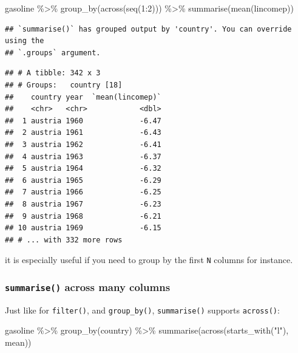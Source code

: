 \documentclass[
]{article}
\newenvironment{Shaded}{\begin{snugshade}}{\end{snugshade}}
\newcommand{\DecValTok}[1]{\textcolor[rgb]{0.00,0.00,0.81}{#1}}
\newcommand{\FunctionTok}[1]{\textcolor[rgb]{0.00,0.00,0.00}{#1}}
\newcommand{\NormalTok}[1]{#1}
\newcommand{\SpecialCharTok}[1]{\textcolor[rgb]{0.00,0.00,0.00}{#1}}
\newcommand{\StringTok}[1]{\textcolor[rgb]{0.31,0.60,0.02}{#1}}
\begin{document}
\begin{Shaded}
\begin{Highlighting}[]
\NormalTok{gasoline }\SpecialCharTok{\%\textgreater{}\%}
  \FunctionTok{group\_by}\NormalTok{(}\FunctionTok{across}\NormalTok{(}\FunctionTok{seq}\NormalTok{(}\DecValTok{1}\SpecialCharTok{:}\DecValTok{2}\NormalTok{))) }\SpecialCharTok{\%\textgreater{}\%}
  \FunctionTok{summarise}\NormalTok{(}\FunctionTok{mean}\NormalTok{(lincomep))}
\end{Highlighting}
\end{Shaded}

\begin{verbatim}
## `summarise()` has grouped output by 'country'. You can override using the
## `.groups` argument.
\end{verbatim}

\begin{verbatim}
## # A tibble: 342 x 3
## # Groups:   country [18]
##    country year  `mean(lincomep)`
##    <chr>   <chr>            <dbl>
##  1 austria 1960             -6.47
##  2 austria 1961             -6.43
##  3 austria 1962             -6.41
##  4 austria 1963             -6.37
##  5 austria 1964             -6.32
##  6 austria 1965             -6.29
##  7 austria 1966             -6.25
##  8 austria 1967             -6.23
##  9 austria 1968             -6.21
## 10 austria 1969             -6.15
## # ... with 332 more rows
\end{verbatim}

it is especially useful if you need to group by the first \texttt{N} columns for instance.

\hypertarget{summarise-across-many-columns}{%
\subsubsection{\texorpdfstring{\texttt{summarise()} across many columns}{summarise() across many columns}}\label{summarise-across-many-columns}}

Just like for \texttt{filter()}, and \texttt{group\_by()}, \texttt{summarise()} supports \texttt{across()}:

\begin{Shaded}
\begin{Highlighting}[]
\NormalTok{gasoline }\SpecialCharTok{\%\textgreater{}\%}
  \FunctionTok{group\_by}\NormalTok{(country) }\SpecialCharTok{\%\textgreater{}\%}
  \FunctionTok{summarise}\NormalTok{(}\FunctionTok{across}\NormalTok{(}\FunctionTok{starts\_with}\NormalTok{(}\StringTok{"l"}\NormalTok{), mean))}
\end{Highlighting}
\end{Shaded}
\end{document}
